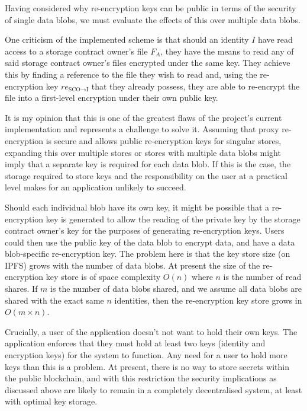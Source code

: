 Having considered why re-encryption keys can be public in terms of the security of single data blobs, we must evaluate the effects of this over multiple data blobs.

One criticism of the implemented scheme is that should an identity $I$ have read access to a storage contract owner's file $F_A$, they have the means to read any of said storage contract owner's files encrypted under the same key. They achieve this by finding a reference to the file they wish to read and, using the re-encryption key $re_{\text{SCO} \rightarrow \text{I}}$ that they already possess, they are able to re-encrypt the file into a first-level encryption under their own public key.

It is my opinion that this is one of the greatest flaws of the project's current implementation and represents a challenge to solve it. Assuming that proxy re-encryption is secure and allows public re-encryption keys for singular stores, expanding this over multiple stores or stores with multiple data blobs might imply that a separate key is required for each data blob. If this is the case, the storage required to store keys and the responsibility on the user at a practical level makes for an application unlikely to succeed.

Should each individual blob have its own key, it might be possible that a re-encryption key is generated to allow the reading of the private key by the storage contract owner's key for the purposes of generating re-encryption keys. Users could then use the public key of the data blob to encrypt data, and have a data blob-specific re-encryption key. The problem here is that the key store size (on IPFS) grows with the number of data blobs. At present the size of the re-encryption key store is of space complexity $O(n)$ where $n$ is the number of read shares. If $m$ is the number of data blobs shared, and we assume all data blobs are shared with the exact same $n$ identities, then the re-encryption key store grows in $O(m \times n)$.

Crucially, a user of the application doesn't not want to hold their own keys. The application enforces that they must hold at least two keys (identity and encryption keys) for the system to function. Any need for a user to hold more keys than this is a problem. At present, there is no way to store secrets within the public blockchain, and with this restriction the security implications as discussed above are likely to remain in a completely decentralised system, at least with optimal key storage.


